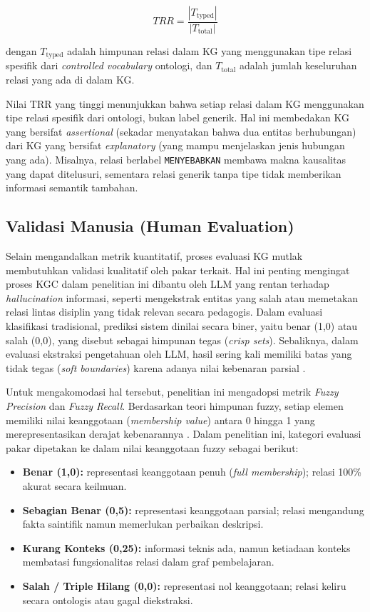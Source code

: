 \documentclass[../../thesis]{subfiles}
\begin{document}
\[
  TRR = \frac{|T_{\text{typed}}|}{|T_{\text{total}}|}
\]

\noindent dengan $T_{\text{typed}}$ adalah himpunan relasi dalam KG yang
menggunakan tipe relasi spesifik dari \textit{controlled vocabulary}
ontologi, dan $T_{\text{total}}$ adalah jumlah keseluruhan relasi yang
ada di dalam KG.

Nilai TRR yang tinggi menunjukkan bahwa setiap relasi dalam KG
menggunakan tipe relasi spesifik dari ontologi, bukan label generik. Hal
ini membedakan KG yang bersifat \textit{assertional} (sekadar menyatakan
bahwa dua entitas berhubungan) dari KG yang bersifat \textit{explanatory}
(yang mampu menjelaskan jenis hubungan yang ada). Misalnya, relasi
berlabel \texttt{MENYEBABKAN} membawa makna kausalitas yang dapat
ditelusuri, sementara relasi generik tanpa tipe tidak memberikan informasi
semantik tambahan.

\subsection{Validasi Manusia (Human Evaluation)}
\label{subsec:validasi-manusia}

Selain mengandalkan metrik kuantitatif, proses evaluasi KG mutlak
membutuhkan validasi kualitatif oleh pakar terkait. Hal ini penting
mengingat proses KGC dalam penelitian ini dibantu oleh LLM yang rentan
terhadap \textit{hallucination} informasi, seperti mengekstrak entitas yang salah
atau memetakan relasi lintas disiplin yang tidak relevan secara
pedagogis. Dalam evaluasi klasifikasi tradisional, prediksi sistem
dinilai secara biner, yaitu benar (1,0) atau salah (0,0), yang
disebut sebagai himpunan tegas (\textit{crisp sets}). Sebaliknya, dalam
evaluasi ekstraksi pengetahuan oleh LLM, hasil sering kali memiliki
batas yang tidak tegas (\textit{soft boundaries}) karena adanya nilai
kebenaran parsial \parencite{harju_evaluating_2023}.

Untuk mengakomodasi hal tersebut, penelitian ini mengadopsi metrik
\textit{Fuzzy Precision} dan \textit{Fuzzy Recall}. Berdasarkan teori himpunan fuzzy, setiap elemen
memiliki nilai keanggotaan (\textit{membership value}) antara 0 hingga 1
yang merepresentasikan derajat kebenarannya \parencite{harju_evaluating_2023}.
Dalam penelitian ini, kategori evaluasi pakar dipetakan ke dalam nilai
keanggotaan fuzzy sebagai berikut:

\begin{itemize}
  \item \textbf{Benar (1,0):} representasi keanggotaan penuh
        (\textit{full membership}); relasi 100\% akurat secara keilmuan.
  \item \textbf{Sebagian Benar (0,5):} representasi keanggotaan parsial;
        relasi mengandung fakta saintifik namun memerlukan perbaikan
        deskripsi.
  \item \textbf{Kurang Konteks (0,25):} informasi teknis ada, namun
        ketiadaan konteks membatasi fungsionalitas relasi dalam graf
        pembelajaran.
  \item \textbf{Salah / Triple Hilang (0,0):} representasi nol
        keanggotaan; relasi keliru secara ontologis atau gagal
        diekstraksi.
\end{itemize}
\end{document}
